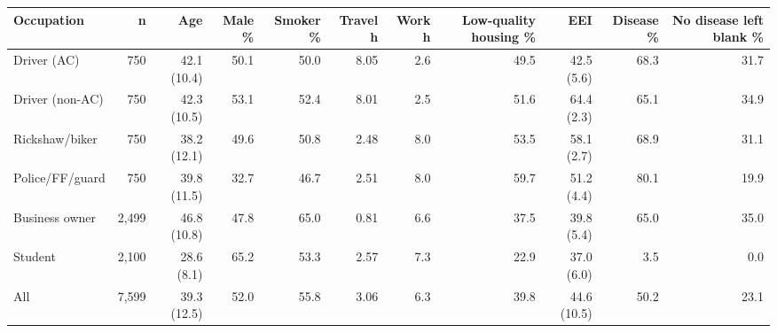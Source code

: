 \begin{tabular}{lrrrrrrrrrr}
\toprule
Occupation & n & Age & Male \% & Smoker \% & Travel h & Work h & Low-quality housing \% & EEI & Disease \% & No disease left blank \% \\
\midrule
Driver (AC) & 750 & 42.1 (10.4) & 50.1 & 50.0 & 8.05 & 2.6 & 49.5 & 42.5 (5.6) & 68.3 & 31.7 \\
Driver (non-AC) & 750 & 42.3 (10.5) & 53.1 & 52.4 & 8.01 & 2.5 & 51.6 & 64.4 (2.3) & 65.1 & 34.9 \\
Rickshaw/biker & 750 & 38.2 (12.1) & 49.6 & 50.8 & 2.48 & 8.0 & 53.5 & 58.1 (2.7) & 68.9 & 31.1 \\
Police/FF/guard & 750 & 39.8 (11.5) & 32.7 & 46.7 & 2.51 & 8.0 & 59.7 & 51.2 (4.4) & 80.1 & 19.9 \\
Business owner & 2,499 & 46.8 (10.8) & 47.8 & 65.0 & 0.81 & 6.6 & 37.5 & 39.8 (5.4) & 65.0 & 35.0 \\
Student & 2,100 & 28.6 (8.1) & 65.2 & 53.3 & 2.57 & 7.3 & 22.9 & 37.0 (6.0) & 3.5 & 0.0 \\
\midrule
All & 7,599 & 39.3 (12.5) & 52.0 & 55.8 & 3.06 & 6.3 & 39.8 & 44.6 (10.5) & 50.2 & 23.1 \\
\bottomrule
\end{tabular}
